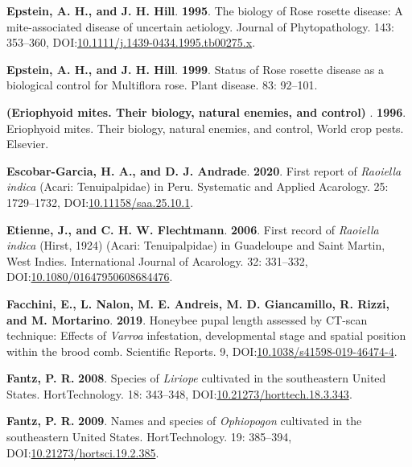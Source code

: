 \documentclass[12pt,final,CPage]{ufthesis}
\newlength{\cslhangindent}
\newenvironment{CSLReferences}[2] %
{%
	\setlength{\parindent}{0pt}
	\ifodd #1 \everypar{\setlength{\hangindent}{\cslhangindent}}\ignorespaces\fi
	\ifnum #2 > 0
	\setlength{\parskip}{#2\baselineskip}
	\fi
}%
{}
\begin{document}
{\begin{CSLReferences}{1}{0}
  \leavevmode{}%
  \textbf{Epstein, A. H., and J. H. Hill}. \textbf{1995}. The biology of {Rose rosette disease}: A mite-associated disease of uncertain aetiology. Journal of Phytopathology. 143: 353--360, DOI:\href{https://doi.org/10.1111/j.1439-0434.1995.tb00275.x}{10.1111/j.1439-0434.1995.tb00275.x}.

  \leavevmode{}%
  \textbf{Epstein, A. H., and J. H. Hill}. \textbf{1999}. Status of {Rose rosette disease} as a biological control for {Multiflora rose}. Plant disease. 83: 92--101.

  \leavevmode{}%
  \textbf{(Eriophyoid mites. Their biology, natural enemies, and control) }. \textbf{1996}. Eriophyoid mites. Their biology, natural enemies, and control, World crop pests. Elsevier.

  \leavevmode{}%
  \textbf{Escobar-Garcia, H. A., and D. J. Andrade}. \textbf{2020}. First report of {\emph{Raoiella indica}} ({Acari}: {Tenuipalpidae}) in {Peru}. Systematic and Applied Acarology. 25: 1729--1732, DOI:\href{https://doi.org/10.11158/saa.25.10.1}{10.11158/saa.25.10.1}.

  \leavevmode{}%
  \textbf{Etienne, J., and C. H. W. Flechtmann}. \textbf{2006}. First record of {\emph{Raoiella indica}} ({Hirst}, 1924) ({Acari}: {Tenuipalpidae}) in {Guadeloupe} and {Saint Martin}, {West Indies}. International Journal of Acarology. 32: 331--332, DOI:\href{https://doi.org/10.1080/01647950608684476}{10.1080/01647950608684476}.

  \leavevmode{}%
  \textbf{Facchini, E., L. Nalon, M. E. Andreis, M. D. Giancamillo, R. Rizzi, and M. Mortarino}. \textbf{2019}. Honeybee pupal length assessed by {CT}-scan technique: Effects of {\emph{Varroa}} infestation, developmental stage and spatial position within the brood comb. Scientific Reports. 9, DOI:\href{https://doi.org/10.1038/s41598-019-46474-4}{10.1038/s41598-019-46474-4}.

  \leavevmode{}%
  \textbf{Fantz, P. R.} \textbf{2008}. Species of {\emph{Liriope}} cultivated in the southeastern {United States}. {HortTechnology}. 18: 343--348, DOI:\href{https://doi.org/10.21273/horttech.18.3.343}{10.21273/horttech.18.3.343}.

  \leavevmode{}%
  \textbf{Fantz, P. R.} \textbf{2009}. Names and species of {\emph{Ophiopogon}} cultivated in the southeastern {United States}. {HortTechnology}. 19: 385--394, DOI:\href{https://doi.org/10.21273/hortsci.19.2.385}{10.21273/hortsci.19.2.385}.


\end{CSLReferences}}
\end{document}
